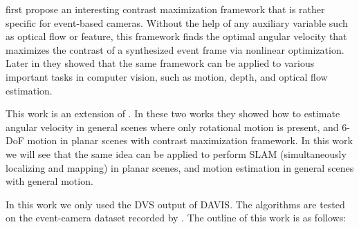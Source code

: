 \citet{gallego2017accurate} first propose an interesting contrast
maximization framework that is rather specific for event-based
cameras. Without the help of any auxiliary variable such as optical
flow or feature, this framework finds the optimal angular velocity
that maximizes the contrast of a synthesized event frame via nonlinear
optimization. Later in \citep{gallego2018unifying} they showed that
the same framework can be applied to various important tasks in
computer vision, such as motion, depth, and optical flow estimation.

This work is an extension of \citep{gallego2017accurate,
  gallego2018unifying}. In these two works they showed how to estimate
angular velocity in general scenes where only rotational motion is
present, and 6-DoF motion in planar scenes with contrast maximization
framework. In this work we will see that the same idea can be applied
to perform SLAM (simultaneously localizing and mapping) in planar
scenes, and motion estimation in general scenes with general motion.

In this work we only used the DVS output of
DAVIS\citep{brandli2014240}. The algorithms are tested on the
event-camera dataset recorded by \citet{mueggler2017event}.  The
outline of this work is as follows:
